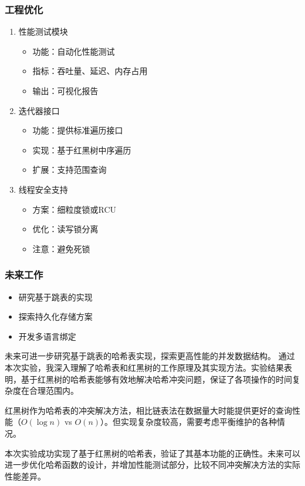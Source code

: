 \documentclass[12pt,a4paper]{article}
\begin{document}
\subsubsection{工程优化}
\begin{enumerate}
\item 性能测试模块
\begin{itemize}
\item 功能：自动化性能测试
\item 指标：吞吐量、延迟、内存占用
\item 输出：可视化报告
\end{itemize}

\item 迭代器接口
\begin{itemize}
\item 功能：提供标准遍历接口
\item 实现：基于红黑树中序遍历
\item 扩展：支持范围查询
\end{itemize}

\item 线程安全支持
\begin{itemize}
\item 方案：细粒度锁或RCU
\item 优化：读写锁分离
\item 注意：避免死锁
\end{itemize}
\end{enumerate}

\subsubsection{未来工作}
\begin{itemize}
\item 研究基于跳表的实现
\item 探索持久化存储方案
\item 开发多语言绑定
\end{itemize}

未来可进一步研究基于跳表的哈希表实现，探索更高性能的并发数据结构。
通过本次实验，我深入理解了哈希表和红黑树的工作原理及其实现方法。实验结果表明，基于红黑树的哈希表能够有效地解决哈希冲突问题，保证了各项操作的时间复杂度在合理范围内。

红黑树作为哈希表的冲突解决方法，相比链表法在数据量大时能提供更好的查询性能（\(O(\log n)\) vs \(O(n)\)）。但实现复杂度较高，需要考虑平衡维护的各种情况。

本次实验成功实现了基于红黑树的哈希表，验证了其基本功能的正确性。未来可以进一步优化哈希函数的设计，并增加性能测试部分，比较不同冲突解决方法的实际性能差异。
\end{document}
